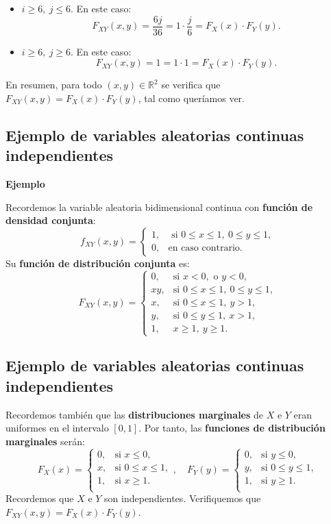 \documentclass[]{book}
\begin{document}
\begin{itemize}
\item
  \(i\geq 6,\ j\leq 6\). En este caso:
  \[
  F_{XY}(x,y)=\frac{6j}{36}=1\cdot \frac{j}{6}=F_X(x)\cdot F_Y(y).
  \]
\item
  \(i\geq 6,\ j\geq 6\). En este caso:
  \[
  F_{XY}(x,y)=1=1\cdot 1=F_X(x)\cdot F_Y(y).
  \]
\end{itemize}

En resumen, para todo \((x,y)\in \mathbb{R}^2\) se verifica que \(F_{XY}(x,y)=F_X(x)\cdot F_Y(y)\), tal como queríamos ver.

\hypertarget{ejemplo-de-variables-aleatorias-continuas-independientes}{%
\subsection{Ejemplo de variables aleatorias continuas independientes}\label{ejemplo-de-variables-aleatorias-continuas-independientes}}

\textbf{Ejemplo}

Recordemos la variable aleatoria bidimensional continua con \textbf{función de densidad conjunta}:
\[
f_{XY}(x,y)=\begin{cases}
1, & \mbox{ si }0\leq x\leq 1,\ 0\leq y\leq 1, \\
0, & \mbox{en caso contrario.}
\end{cases}
\]
Su \textbf{función de distribución conjunta} es:
\[
F_{XY}(x,y)=\begin{cases}
0, & \mbox{si }x<0,\mbox{ o }y<0,\\
xy, & \mbox{si }0\leq x\leq 1,\ 0\leq y\leq 1, \\
x, & \mbox{si }0\leq x\leq 1,\ y> 1, \\
y, & \mbox{si }0\leq y\leq 1,\ x> 1, \\
1, & x\geq 1,\ y\geq 1.
\end{cases}
\]

\hypertarget{ejemplo-de-variables-aleatorias-continuas-independientes-1}{%
\subsection{Ejemplo de variables aleatorias continuas independientes}\label{ejemplo-de-variables-aleatorias-continuas-independientes-1}}

Recordemos también que las \textbf{distribuciones marginales} de \(X\) e \(Y\) eran uniformes en el intervalo \([0,1]\). Por tanto, las \textbf{funciones de distribución marginales} serán:
\[
F_X(x)=\begin{cases}
0, & \mbox{si }x\leq 0, \\
x, & \mbox{si }0\leq x\leq 1, \\
1, & \mbox{si }x\geq 1. \\
\end{cases},\quad 
F_Y(y)=\begin{cases}
0, & \mbox{si }y\leq 0, \\
y, & \mbox{si }0\leq y\leq 1, \\
1, & \mbox{si }y\geq 1. \\
\end{cases}
\]
Recordemos que \(X\) e \(Y\) son independientes. Verifiquemos que \(F_{XY}(x,y)=F_X(x)\cdot F_Y(y)\).
\end{document}
